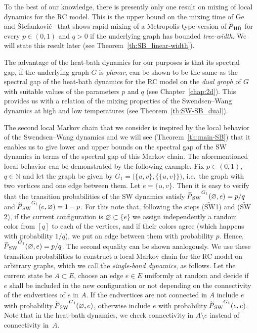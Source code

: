 \documentclass{dis}
\theoremstyle{citing}
\begin{document}
To the best of our knowledge, there is presently only one result 
on mixing of local dynamics for the RC model. 
This is the upper bound on the mixing time of Ge and 
\v{S}tefankovi\v{c}~\cite{GeS} that 
shows rapid mixing of a Metropolis-type version of ${{\raisebox{2pt}{ ${\widetilde{{}}}$ }\mkern-14mu P}_{\rm HB}}$ 
for every $p\in(0,1)$ and $q>0$ 
if the underlying graph has bounded \emph{tree-width}. 
We will state this result later (see 
Theorem~\ref{th:SB_linear-width}).

The advantage of the heat-bath dynamics for our purposes is that 
its spectral gap, if the underlying graph $G$ is \emph{planar}, 
can be shown to be the same as the spectral gap of 
the heat-bath dynamics for the RC model on the \emph{dual graph} 
of $G$ with suitable values of the parameters $p$ and $q$ 
(see Chapter~\ref{chap:2d}). 
This provides us with a relation of the mixing properties 
of the Swendsen--Wang dynamics at high 
and low temperatures  (see Theorem~\ref{th:SW-SB_dual}).

The second local Markov chain that we consider is inspired by 
the local behavior of the Swendsen--Wang dynamics and we will 
see (Theorem~\ref{th:main-SB}) that it enables us to give 
lower and upper bounds on the spectral gap of the SW dynamics 
in terms of the spectral gap of this Markov chain.
The aforementioned local behavior can be demonstrated by the 
following example. 
Fix $p\in(0,1)$, $q\in{\ensuremath{\mathbb{N}}}$ and let the graph be given 
by $G_1=\bigl(\{u,v\},\bigl\{\{u,v\}\bigr\}\bigr)$, 
i.e.~the graph with two vertices and one edge between them. 
Let $e=\{u,v\}$. Then it is easy to verify that the transition 
probabilities of the SW dynamics satisfy
${{\raisebox{2pt}{ ${\widetilde{{}}}$ }\mkern-14mu P}_{\rm SW}}^{G_1}(\varnothing,e)=p/q$ and 
${{\raisebox{2pt}{ ${\widetilde{{}}}$ }\mkern-14mu P}_{\rm SW}}^{G_1}(e,\varnothing)=1-p$. 
For this note that, 
following the steps (${\widetilde{{\text{SW}}}}$1) and 
(${\widetilde{{\text{SW}}}}$2), if the current configuration is 
$\varnothing\subset \{e\}$ we assign independently a random color 
from $[q]$ to each of the vertices, and if their colors agree 
(which happens with probability $1/q$), we 
put an edge between them with probability $p$. 
Hence, ${{\raisebox{2pt}{ ${\widetilde{{}}}$ }\mkern-14mu P}_{\rm SW}}^{G_1}(\varnothing,e)=p/q$.
The second equality can be shown analogously. 
We use these transition probabilities to construct a 
local Markov chain for the RC model on arbitrary graphs, 
which we call the \emph{single-bond dynamics}, as follows. 
Let the current state be $A\subset E$, 
choose an edge $e\in E$ uniformly at random and decide if $e$ 
shall be included in the new configuration or not depending on 
the connectivity of the endvertices of $e$ in $A$. 
If the endvertices are not connected in $A$ include $e$ with 
probability ${{\raisebox{2pt}{ ${\widetilde{{}}}$ }\mkern-14mu P}_{\rm SW}}^{G_1}(\varnothing,e)$, otherwise include $e$ with 
probability ${{\raisebox{2pt}{ ${\widetilde{{}}}$ }\mkern-14mu P}_{\rm SW}}^{G_1}(e,e)$.
Note that in the heat-bath dynamics, we check 
connectivity in $A\setminus e$ instead of connectivity in~$A$.
\end{document}

